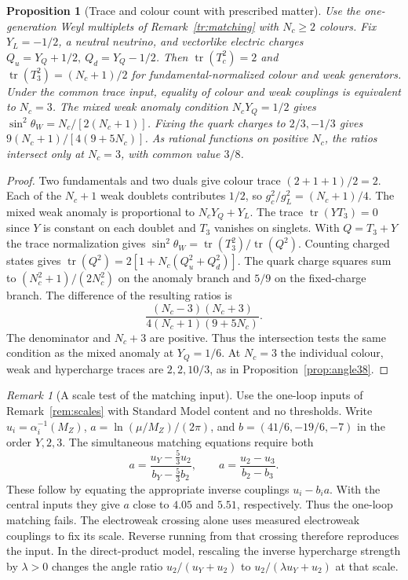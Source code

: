 \documentclass[aps,pra,onecolumn,superscriptaddress,nofootinbib,10pt]{revtex4-2}
\newtheorem{proposition}[theorem]{Proposition}
\theoremstyle{definition}
\theoremstyle{remark}
\newtheorem{remark}[theorem]{Remark}
\begin{document}
\begin{proposition}[Trace and colour count with prescribed matter]\label{tr:traces}
Use the one-generation Weyl multiplets of Remark~\ref{tr:matching}
with \(N_c\geq2\) colours. Fix \(Y_L=-1/2\), a neutral neutrino,
and vectorlike electric charges \(Q_u=Y_Q+1/2,\ Q_d=Y_Q-1/2\).
Then \(\operatorname{tr}(T_c^2)=2\) and
\(\operatorname{tr}(T_3^2)=(N_c+1)/2\) for fundamental-normalized
colour and weak generators. Under the common trace input, equality of
colour and weak couplings is equivalent to \(N_c=3\).
The mixed weak anomaly condition \(N_cY_Q=1/2\) gives
\(\sin^2\theta_W=N_c/[2(N_c+1)]\). Fixing the quark charges
to \(2/3,-1/3\) gives \(9(N_c+1)/[4(9+5N_c)]\).
As rational functions on positive \(N_c\), the ratios intersect
only at \(N_c=3\), with common value \(3/8\).
\end{proposition}
\begin{proof}
Two fundamentals and two duals give colour trace \((2+1+1)/2=2\).
Each of the \(N_c+1\) weak doublets contributes \(1/2\), so
\(g_c^2/g_L^2=(N_c+1)/4\). The mixed weak anomaly is proportional
to \(N_cY_Q+Y_L\). The trace \(\operatorname{tr}(YT_3)=0\)
since \(Y\) is constant on each doublet and \(T_3\) vanishes on
singlets. With \(Q=T_3+Y\) the trace normalization gives
\(\sin^2\theta_W=\operatorname{tr}(T_3^2)/\operatorname{tr}(Q^2)\).
Counting charged states gives
\(\operatorname{tr}(Q^2)=2[1+N_c(Q_u^2+Q_d^2)]\).
The quark charge squares sum to \((N_c^2+1)/(2N_c^2)\) on the
anomaly branch and \(5/9\) on the fixed-charge branch. The difference
of the resulting ratios is
\[
 \frac{(N_c-3)(N_c+3)}{4(N_c+1)(9+5N_c)}.
\]
The denominator and \(N_c+3\) are positive. Thus the intersection
tests the same condition as the mixed anomaly at \(Y_Q=1/6\).
At \(N_c=3\) the individual colour, weak and hypercharge traces are
\(2,2,10/3\), as in Proposition~\ref{prop:angle38}.
\end{proof}

\begin{remark}[A scale test of the matching input]\label{tr:running}
Use the one-loop inputs of Remark~\ref{rem:scales} with Standard Model
content and no thresholds. Write \(u_i=\alpha_i^{-1}(M_Z)\),
\(a=\ln(\mu/M_Z)/(2\pi)\), and \(b=(41/6,-19/6,-7)\) in the
order \(Y,2,3\). The simultaneous matching equations require both
\[
 a=\frac{u_Y-\tfrac53u_2}{b_Y-\tfrac53 b_2},
 \qquad
 a=\frac{u_2-u_3}{b_2-b_3}.
\]
These follow by equating the appropriate inverse couplings
\(u_i-b_i a\). With the central inputs they give \(a\) close to
\(4.05\) and \(5.51\), respectively. Thus the one-loop matching fails.
The electroweak crossing alone uses measured electroweak couplings to
fix its scale. Reverse running from that crossing therefore reproduces
the input. In the direct-product model, rescaling the inverse
hypercharge strength by \(\lambda>0\) changes the angle ratio
\(u_2/(u_Y+u_2)\) to \(u_2/(\lambda u_Y+u_2)\) at that scale.
\end{remark}
\end{document}
